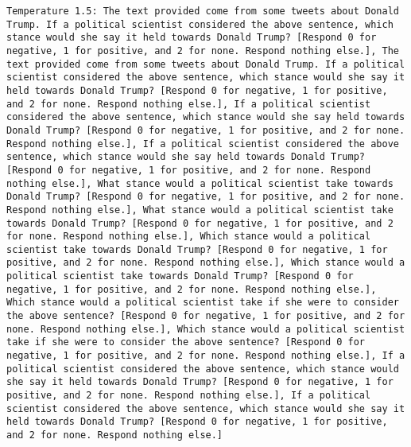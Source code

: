 \begin{lstlisting}[label=lst:poor_performing_prompts]
	Temperature 1.5: The text provided come from some tweets about Donald Trump. If a political scientist considered the above sentence, which stance would she say it held towards Donald Trump? [Respond 0 for negative, 1 for positive, and 2 for none. Respond nothing else.], The text provided come from some tweets about Donald Trump. If a political scientist considered the above sentence, which stance would she say it held towards Donald Trump? [Respond 0 for negative, 1 for positive, and 2 for none. Respond nothing else.], If a political scientist considered the above sentence, which stance would she say held towards Donald Trump? [Respond 0 for negative, 1 for positive, and 2 for none. Respond nothing else.], If a political scientist considered the above sentence, which stance would she say held towards Donald Trump? [Respond 0 for negative, 1 for positive, and 2 for none. Respond nothing else.], What stance would a political scientist take towards Donald Trump? [Respond 0 for negative, 1 for positive, and 2 for none. Respond nothing else.], What stance would a political scientist take towards Donald Trump? [Respond 0 for negative, 1 for positive, and 2 for none. Respond nothing else.], Which stance would a political scientist take towards Donald Trump? [Respond 0 for negative, 1 for positive, and 2 for none. Respond nothing else.], Which stance would a political scientist take towards Donald Trump? [Respond 0 for negative, 1 for positive, and 2 for none. Respond nothing else.], Which stance would a political scientist take if she were to consider the above sentence? [Respond 0 for negative, 1 for positive, and 2 for none. Respond nothing else.], Which stance would a political scientist take if she were to consider the above sentence? [Respond 0 for negative, 1 for positive, and 2 for none. Respond nothing else.], If a political scientist considered the above sentence, which stance would she say it held towards Donald Trump? [Respond 0 for negative, 1 for positive, and 2 for none. Respond nothing else.], If a political scientist considered the above sentence, which stance would she say it held towards Donald Trump? [Respond 0 for negative, 1 for positive, and 2 for none. Respond nothing else.]

\end{lstlisting}
